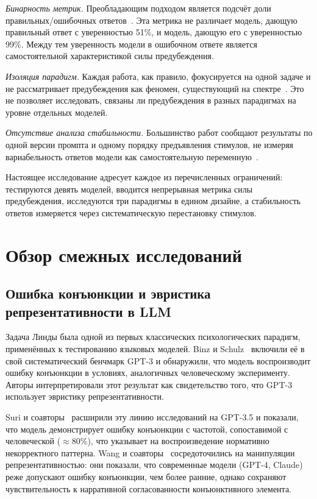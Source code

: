 \textit{Бинарность метрик.} Преобладающим подходом является подсчёт доли правильных/ошибочных ответов~\cite{macmillan2024irrationality, jiang2024peek}. Эта метрика не различает модель, дающую правильный ответ с уверенностью 51\%, и модель, дающую его с уверенностью 99\%. Между тем уверенность модели в ошибочном ответе является самостоятельной характеристикой силы предубеждения.

\textit{Изоляция парадигм.} Каждая работа, как правило, фокусируется на одной задаче и не рассматривает предубеждения как феномен, существующий на спектре~\cite{yax2024studying}. Это не позволяет исследовать, связаны ли предубеждения в разных парадигмах на уровне отдельных моделей.

\textit{Отсутствие анализа стабильности.} Большинство работ сообщают результаты по одной версии промпта и одному порядку предъявления стимулов, не измеряя вариабельность ответов модели как самостоятельную переменную~\cite{macmillan2024irrationality}.

Настоящее исследование адресует каждое из перечисленных ограничений: тестируются девять моделей, вводится непрерывная метрика силы предубеждения, исследуются три парадигмы в едином дизайне, а стабильность ответов измеряется через систематическую перестановку стимулов.

\section{Обзор смежных исследований}

\subsection{Ошибка конъюнкции и эвристика репрезентативности в LLM}

Задача Линды была одной из первых классических психологических парадигм, применённых к тестированию языковых моделей. Binz и Schulz~\cite{binz2023using} включили её в свой систематический бенчмарк GPT-3 и обнаружили, что модель воспроизводит ошибку конъюнкции в условиях, аналогичных человеческому эксперименту. Авторы интерпретировали этот результат как свидетельство того, что GPT-3 использует эвристику репрезентативности.

Suri и соавторы~\cite{suri2024large} расширили эту линию исследований на GPT-3.5 и показали, что модель демонстрирует ошибку конъюнкции с частотой, сопоставимой с человеческой ($\approx$80\%), что указывает на воспроизведение нормативно некорректного паттерна. Wang и соавторы~\cite{wang2024linda} сосредоточились на манипуляции репрезентативностью: они показали, что современные модели (GPT-4, Claude) реже допускают ошибку конъюнкции, чем более ранние, однако сохраняют чувствительность к нарративной согласованности конъюнктивного элемента.

